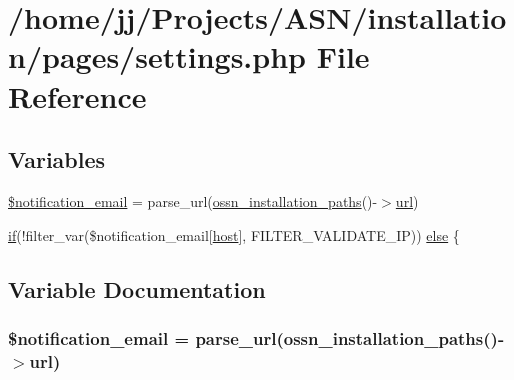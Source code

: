 \hypertarget{installation_2pages_2settings_8php}{}\section{/home/jj/\+Projects/\+A\+S\+N/installation/pages/settings.php File Reference}
\label{installation_2pages_2settings_8php}
\subsection*{Variables}
\begin{DoxyCompactItemize}
\item 
\hyperlink{installation_2pages_2settings_8php_af4e8b9d68c020fc6db842a8cfa17ca68}{\$notification\+\_\+email} = parse\+\_\+url(\hyperlink{ossn_8install_8php_aee293727c85b476f39c8c4d5a1774b48}{ossn\+\_\+installation\+\_\+paths}()-\/$>$\hyperlink{ossn_8config_8site_8example_8php_ad643c3db2725019ef8130393d549e6db}{url})
\item 
\hyperlink{jquery_8tokeninput_8js_ad8dd46a3cbc004569e34401e9e71771a}{if}(!filter\+\_\+var(\$notification\+\_\+email\mbox{[}\textquotesingle{}\hyperlink{ossn_8config_8db_8example_8php_a5bc8babfba069f855b3288f34a926b5a}{host}\textquotesingle{}\mbox{]}, F\+I\+L\+T\+E\+R\+\_\+\+V\+A\+L\+I\+D\+A\+T\+E\+\_\+\+IP)) \hyperlink{installation_2pages_2settings_8php_a76278e213f097f9a2cf8e8a3759df6f1}{else} \{
\end{DoxyCompactItemize}


\subsection{Variable Documentation}
\subsubsection[{\texorpdfstring{\$notification\+\_\+email}{$notification_email}}]{\setlength{\rightskip}{0pt plus 5cm}\$notification\+\_\+email = parse\+\_\+url({\bf ossn\+\_\+installation\+\_\+paths}()-\/$>${\bf url})}\hypertarget{installation_2pages_2settings_8php_af4e8b9d68c020fc6db842a8cfa17ca68}{}\label{installation_2pages_2settings_8php_af4e8b9d68c020fc6db842a8cfa17ca68}


